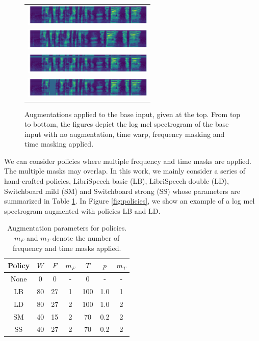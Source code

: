 \documentclass[a4paper]{article}
\begin{document}
\begin{figure}[t]
  \centering
  \begin{tabular}{c}
  \includegraphics[height=1.0cm]{figures/base.png} \\
  \includegraphics[height=1.0cm]{figures/twarp.png} \\
  \includegraphics[height=1.0cm]{figures/fblock.png} \\
  \includegraphics[height=1.0cm]{figures/tblock.png}
  \end{tabular}
  \vskip -0.1in
  \caption{Augmentations applied to the base input, given at the top. From top to bottom, the figures depict the log mel spectrogram of the base input with no augmentation, time warp, frequency masking and time masking applied.}
  \label{fig:augs}
\end{figure}

We can consider policies where multiple frequency and time masks are applied. The multiple masks may overlap. In this work, we mainly consider a series of hand-crafted policies, LibriSpeech basic (LB), LibriSpeech double (LD), Switchboard mild (SM) and Switchboard strong (SS) whose parameters are summarized in Table \ref{t:policies}. In Figure \ref{fig:policies}, we show an example of a log mel spectrogram augmented with policies LB and LD.

\begin{table}[h]
  \caption{Augmentation parameters for policies. $m_F$ and $m_T$ denote the number of frequency and time masks applied.}
  \label{t:policies}
  \centering
  \footnotesize
  \begin{tabular}{ccccccc}
    \toprule
    Policy & $W$ & $F$ & $m_F$ & $T$ & $p$ & $m_T$ \\
    \midrule
    None & 0 & 0 & - & 0 & - & - \\
    LB & 80 & 27 & 1 & 100 & 1.0 & 1\\
    LD & 80 & 27 & 2 & 100 & 1.0 & 2 \\
    SM & 40 & 15 & 2 & 70 & 0.2 & 2\\
    SS & 40 & 27 & 2 & 70 & 0.2 & 2\\
    \bottomrule
  \end{tabular}
  \vskip -0.1in
\end{table}
\end{document}
